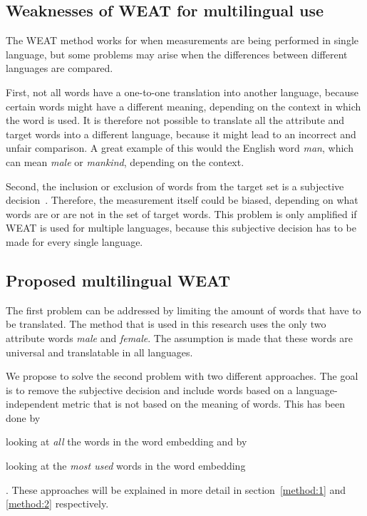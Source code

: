 \subsection{Weaknesses of WEAT for multilingual use}
The WEAT method works for when measurements are being performed in single language, but
some problems may arise when the differences between different languages are
compared.

First, not all words have a one-to-one translation into another
language, because certain words might have a different meaning, depending on the
context in which the word is used. It is therefore not possible to translate all the
attribute and target words into a different language, because it might lead to an
incorrect and unfair comparison. A great example of this would the English word
\textit{man}, which can mean \textit{male} or \textit{mankind}, depending on the context.

Second, the inclusion or exclusion of words from
the target set is a subjective decision~\parencite{nissim_fair_is_better_2020}. Therefore,
the measurement itself could be biased, depending on what words are or are not in the set
of target words. This problem is only amplified if WEAT is used for multiple languages,
because this subjective decision has to be made for every single language.

\subsection{Proposed multilingual WEAT}
The first problem can be addressed by limiting the amount of words that have to be
translated. The method that is used in this research uses the only two attribute words 
\textit{male} and \textit{female}. The assumption is made that these words are universal
and translatable in all languages. 

We propose to solve the second problem with two different approaches. The goal is to
remove the subjective decision and include words based on a language-independent metric
that is not based on the meaning of words. This has been done by
\begin{enumerate*}[label={(\alph*)}]
    \item looking at \emph{all} the words in the word embedding and by
    \item looking at the \emph{most used} words in the word embedding
\end{enumerate*}.
These approaches will be explained in more detail in section~\ref{method:1} and
\ref{method:2} respectively.

